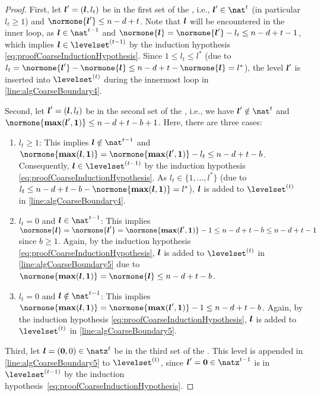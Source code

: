 \begin{proof}
  First, let ${\boldsymbol{l}}' = ({\boldsymbol{l}}, l_t)$ be in the first set of the \rhs,
  i.e., $\*l' \in \nat^t$ (in particular $l_t \ge 1$) and
  $\normone{\*l'} \le n - d + t$.
  Note that ${\boldsymbol{l}}$ will be encountered in the inner loop, as
  $\*l \in \nat^{t-1}$ and
  $\normone{\*l} = \normone{\*l'} - l_t \le n - d + t - 1$,
  which implies $\*l \in \levelset^{(t-1)}$ by the induction
  hypothesis \eqref{eq:proofCoarseInductionHypothesis}.
  Since $1 \le l_t \le l^\ast$
  (due to
  $l_t = \normone{\*l'} - \normone{\*l} \le n-d+t - \normone{\*l} = l^\ast$),
  the level ${\boldsymbol{l}}'$ is inserted into $\levelset^{(t)}$ during the innermost loop
  in \cref{line:algCoarseBoundary4}.
  
  Second, let ${\boldsymbol{l}}' = ({\boldsymbol{l}}, l_t)$
  be in the second set of the \rhs, i.e., we have
  $\*l' \notin \nat^t$ and
  $\normone{\vecmax(\*l', \*1)} \le n-d+t-b+1$.
  Here, there are three cases:
  \begin{enumerate}
    \item
    $l_t \ge 1$:
    This implies $\*l \notin \nat^{t-1}$ and 
    $\normone{\vecmax(\*l, \*1)}
    = \normone{\vecmax(\*l', \*1)} - l_t
    \le n-d+t-b$.
    Consequently, $\*l \in \levelset^{(t-1)}$ by the induction hypothesis
    \eqref{eq:proofCoarseInductionHypothesis}.
    As $l_t \in \{1, \dotsc, l^\ast\}$
    (due to $l_t \le n-d+t-b -
    \normone{\vecmax(\*l, \*1)} = l^\ast$),
    ${\boldsymbol{l}}$ is added to $\levelset^{(t)}$ in \cref{line:algCoarseBoundary4}.
    
    \item
    $l_t = 0$ and $\*l \in \nat^{t-1}$:
    This implies $\normone{\*l} = \normone{\*l'}
    = \normone{\vecmax(\*l', \*1)} - 1
    \le n - d + t - b
    \le n - d + t - 1$ since $b \ge 1$.
    Again, by the induction hypothesis
    \eqref{eq:proofCoarseInductionHypothesis},
    ${\boldsymbol{l}}$ is added to $\levelset^{(t)}$ in \cref{line:algCoarseBoundary5}
    due to
    $\normone{\vecmax(\*l, \*1)}
    = \normone{\*l} \le n - d + t - b$.
    
    \item
    $l_t = 0$ and $\*l \notin \nat^{t-1}$:
    This implies $\normone{\vecmax(\*l, \*1)}
    = \normone{\vecmax(\*l', \*1)} - 1
    \le n - d + t - b$.
    Again, by the induction hypothesis
    \eqref{eq:proofCoarseInductionHypothesis},
    ${\boldsymbol{l}}$ is added to $\levelset^{(t)}$ in \cref{line:algCoarseBoundary5}.
  \end{enumerate}
  
  Third, let $\*l = (\vec{0}, 0) \in \natz^t$
  be in the third set of the \rhs.
  This level is appended in \cref{line:algCoarseBoundary5}
  to $\levelset^{(t)}$, since $\*l' = \vec{0} \in \natz^{t-1}$
  is in $\levelset^{(t-1)}$ by the
  induction hypothesis~\eqref{eq:proofCoarseInductionHypothesis}.
\end{proof}
